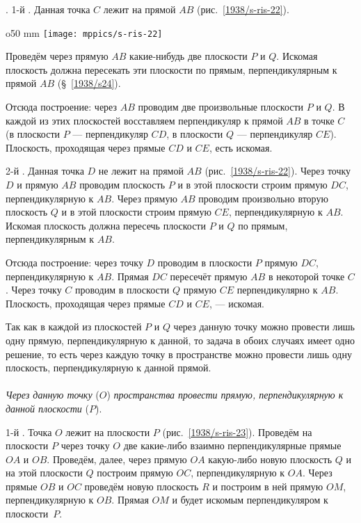 \medskip

.
1-й .
Данная точка $C$ лежит на прямой $AB$ (рис.~\ref{1938/s-ris-22}).

\begin{wrapfigure}{o}{50 mm}
\centering
\texttt{[image: mppics/s-ris-22]}
\caption{}\label{1938/s-ris-22}
\end{wrapfigure}

Проведём через прямую $AB$ какие-нибудь две плоскости $P$ и $Q$.
Искомая плоскость должна пересекать эти плоскости по прямым, перпендикулярным к прямой $AB$ (§~\ref{1938/s24}).

Отсюда построение: через $AB$ проводим две произвольные плоскости $P$ и $Q$.
В каждой из этих плоскостей восставляем перпендикуляр к прямой $AB$ в точке $C$ (в плоскости $P$ — перпендикуляр $CD$, в плоскости $Q$ — перпендикуляр $CE$).
Плоскость, проходящая через прямые $CD$ и $CE$, есть искомая.

2-й .
Данная точка $D$ не лежит на прямой $AB$ (рис.~\ref{1938/s-ris-22}).
Через точку $D$ и прямую $AB$ проводим плоскость $P$ и в этой плоскости строим прямую $DC$, перпендикулярную к $AB$.
Через прямую $AB$ проводим произвольно вторую плоскость $Q$ и в этой плоскости строим прямую $CE$, перпендикулярную к $AB$.
Искомая плоскость должна пересечь плоскости $P$ и $Q$ по прямым, перпендикулярным к $AB$.

Отсюда построение: через точку $D$ проводим в плоскости $P$ прямую $DC$, перпендикулярную к $AB$.
Прямая $DC$ пересечёт прямую $AB$ в некоторой точке $C$.
Через точку $C$ проводим в плоскости $Q$ прямую $CE$ перпендикулярно к $AB$.
Плоскость, проходящая через прямые $CD$ и $CE$, — искомая.

Так как в каждой из плоскостей $P$ и $Q$ через данную точку можно провести лишь одну прямую, перпендикулярную к данной, то задача в обоих случаях имеет одно решение, то есть через каждую точку в пространстве можно провести лишь одну плоскость, перпендикулярную к данной прямой.

\paragraph{}\label{1938/s36}
\emph{Через данную точку} ($O$) \emph{пространства провести прямую, перпендикулярную к данной плоскости} ($P$).

1-й .
Точка $O$ лежит на плоскости $P$ (рис.~\ref{1938/s-ris-23}).
Проведём на плоскости $P$ через точку $O$ две какие-либо взаимно перпендикулярные прямые $OA$ и $OB$.
Проведём, далее, через прямую $OA$ какую-либо новую плоскость $Q$ и на этой плоскости $Q$ построим прямую $OC$, перпендикулярную к $OA$.
Через прямые $OB$ и $OC$ проведём новую плоскость $R$ и построим в ней прямую $OM$, перпендикулярную к $OB$.
Прямая $OM$ и будет искомым перпендикуляром к плоскости~$P$.

